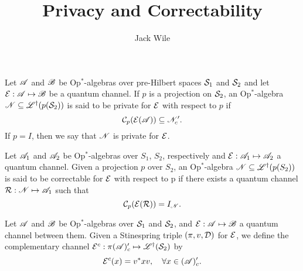 \documentclass[12pt]{article}
\title{Privacy and Correctability}
\author{Jack Wile}
\date{}
\begin{document}
	
\maketitle

	
	


\begin{definition}
	
	Let $\mathscr{A}$ and $\mathscr{B}$ be Op$^*$-algebras over pre-Hilbert spaces $\mathcal{S}_1$ and $\mathcal{S}_2$ and let $\mathcal{E}: \mathscr{A} \mapsto \mathscr{B}$ be a quantum channel.
	If $p$ is a projection on $\mathcal{S}_2$, an Op$^*$-algebra $\mathscr{N} \subseteq \mathscr{L}^\dagger(p(\mathcal{S}_2))$ is said to be private for $\mathcal{E}$ with respect to $p$ if 
	\[\mathcal{C}_p(\mathcal{E}(\mathscr{A})) \subseteq \mathscr{N}'_c.\] If $p = I$, then we say that $\mathscr{N}$ is private for $\mathcal{E}$.

\end{definition}

\begin{definition}
	
	Let $\mathscr{A}_1$ and $\mathscr{A}_2$ be Op$^*$-algebras over $S_1$, $S_2$, respectively and $\mathcal{E}: \mathscr{A}_1 \mapsto \mathscr{A}_2$ a quantum channel.
	Given a projection $p$ over $S_2$, an Op$^*$-algebra $\mathscr{N} \subseteq \mathscr{L}^\dagger(p(S_2))$ is said to be correctable for $\mathcal{E}$ with respect
	to p if there exists a quantum channel $\mathcal{R}: \mathscr{N} \mapsto \mathscr{A}_1$ such that \[\mathcal{C}_p(\mathcal{E}(\mathcal{R})) = I_\mathscr{N}.\] 
	

\end{definition}

\begin{definition}
	
	Let $\mathscr{A}$ and $\mathscr{B}$ be Op$^*$-algebras over $\mathcal{S}_1$ and $\mathcal{S}_2$, and $\mathcal{E}: \mathscr{A} \mapsto \mathscr{B}$ a quantum channel between them. 
	Given a Stinespring triple $(\pi, v, \mathcal{D})$ for $\mathcal{E}$, we define the complementary channel $\mathcal{E}^c: \pi(\mathscr{A})'_c \mapsto \mathscr{L}^\dagger(\mathcal{S}_2)$
	by \[\mathcal{E}^c(x) = v^*xv, \quad  \forall  x \in (\mathscr{A})'_c.\]  

\end{definition}
\end{document}
